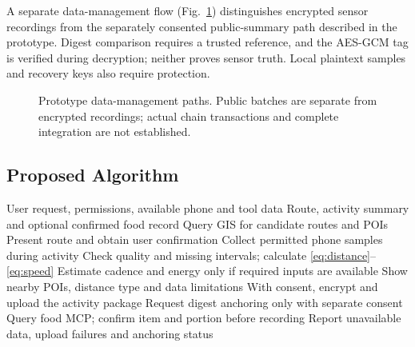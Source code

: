 A separate data-management flow (Fig.~\ref{fig:data-flow}) distinguishes encrypted sensor recordings from the separately consented public-summary path described in the prototype. Digest comparison requires a trusted reference, and the AES-GCM tag is verified during decryption; neither proves sensor truth. Local plaintext samples and recovery keys also require protection.
\begin{figure}[t]
\centering
{}
\caption{Prototype data-management paths. Public batches are separate from encrypted recordings; actual chain transactions and complete integration are not established.}
\label{fig:data-flow}
\end{figure}

\subsection{Proposed Algorithm}
\begin{algorithm}[t]
\caption{Mobile Exercise and Food Workflow}
\begin{algorithmic}[1]
\Require User request, permissions, available phone and tool data
\Ensure Route, activity summary and optional confirmed food record
\State Query GIS for candidate routes and POIs
\State Present route and obtain user confirmation
\State Collect permitted phone samples during activity
\State Check quality and missing intervals; calculate \eqref{eq:distance}--\eqref{eq:speed}
\State Estimate cadence and energy only if required inputs are available
\State Show nearby POIs, distance type and data limitations
\State With consent, encrypt and upload the activity package
\State Request digest anchoring only with separate consent
\State Query food MCP; confirm item and portion before recording
\EndIf
\State Report unavailable data, upload failures and anchoring status
\end{algorithmic}
\end{algorithm}
